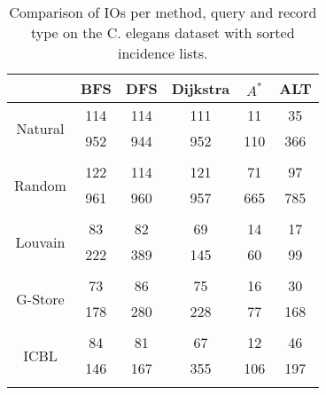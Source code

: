 \begin{table}
	\begin{center}
		 \begin{tabular}[c]{c c c c c c} \toprule
			  & BFS & DFS & Dijkstra & $A^*$  & ALT \\ \midrule 
 			\multirow{2}{*}{Natural}  & 114 & 114 & 111 & 11 & 35 \\ 
 				 & 952 & 944 & 952 & 110 & 366 \\ 
 				&&&&& \\[-0.5em]
 			\multirow{2}{*}{Random}  & 122 & 114 & 121 & 71 & 97 \\ 
 				 & 961 & 960 & 957 & 665 & 785 \\ 
 				&&&&& \\[-0.5em]
 			\multirow{2}{*}{Louvain}  & 83 & 82 & 69 & 14 & 17 \\ 
 				 & 222 & 389 & 145 & 60 & 99 \\ 
 				&&&&& \\[-0.5em]
 			\multirow{2}{*}{G-Store}  & 73 & 86 & 75 & 16 & 30 \\ 
 				 & 178 & 280 & 228 & 77 & 168 \\ 
 				&&&&& \\[-0.5em]
 			\multirow{2}{*}{ICBL}  & 84 & 81 & 67 & 12 & 46 \\ 
 				 & 146 & 167 & 355 & 106 & 197 \\ 
 				&&&&& \\[-0.5em]
 					\end{tabular}  
  	 \end{center}
	 \caption{Comparison of IOs per method, query and record type on the C. elegans dataset with sorted incidence lists.}
	 \label{ce-s}
\end{table}
